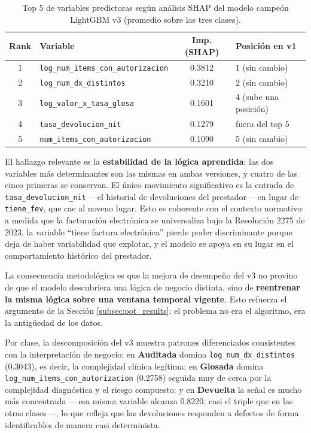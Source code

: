 \documentclass[12pt,letterpaper]{report}
\newcommand{\idb}{\discretionary{}{}{}}
\begin{document}
\begin{table}[H]
\centering
\caption{Top 5 de variables predictoras según análisis SHAP del modelo campeón LightGBM v3
(promedio sobre las tres clases).}
\label{tab:top_features_v3}
\small
\begin{tabular}{@{}cp{5.2cm}cp{5.1cm}@{}}
\toprule
\textbf{Rank} & \textbf{Variable} & \textbf{Imp. (SHAP)} & \textbf{Posición en v1} \\
\midrule
1 & \texttt{log\_num\_items\_\idb con\_autorizacion} & 0.3812 & 1 (sin cambio) \\
2 & \texttt{log\_num\_dx\_distintos} & 0.3210 & 2 (sin cambio) \\
3 & \texttt{log\_valor\_x\_tasa\_glosa} & 0.1601 & 4 (sube una posición) \\
4 & \texttt{tasa\_devolucion\_nit} & 0.1279 & fuera del top 5 \\
5 & \texttt{num\_items\_con\_\idb autorizacion} & 0.1090 & 5 (sin cambio) \\
\bottomrule
\end{tabular}
\end{table}

El hallazgo relevante es la \textbf{estabilidad de la lógica aprendida}: las dos
variables más determinantes son las mismas en ambas versiones, y cuatro de las cinco
primeras se conservan. El único movimiento significativo es la entrada de
\texttt{tasa\_devolucion\_nit} —el historial de devoluciones del prestador— en lugar de
\texttt{tiene\_fev}, que cae al noveno lugar. Esto es coherente con el contexto
normativo: a medida que la facturación electrónica se universaliza bajo la Resolución
2275 de 2023, la variable ``tiene factura electrónica'' pierde poder discriminante
porque deja de haber variabilidad que explotar, y el modelo se apoya en su lugar en el
comportamiento histórico del prestador.

La consecuencia metodológica es que la mejora de desempeño del v3 no provino de que el
modelo descubriera una lógica de negocio distinta, sino de \textbf{reentrenar la misma
lógica sobre una ventana temporal vigente}. Esto refuerza el argumento de la
Sección \ref{subsec:oot_results}: el problema no era el algoritmo, era la antigüedad de
los datos.

Por clase, la descomposición del v3 muestra patrones diferenciados consistentes con la
interpretación de negocio: en \textbf{Auditada} domina \texttt{log\_num\_dx\_\idb distintos}
(0.3043), es decir, la complejidad clínica legítima; en \textbf{Glosada} domina
\texttt{log\_num\_items\_\idb con\_\idb autorizacion} (0.2758) seguida muy de cerca por la
complejidad diagnóstica y el riesgo compuesto; y en \textbf{Devuelta} la señal es mucho
más concentrada —\,esa misma variable alcanza 0.8220, casi el triple que en las otras
clases\,—, lo que refleja que las devoluciones responden a defectos de forma
identificables de manera casi determinista.
\end{document}
